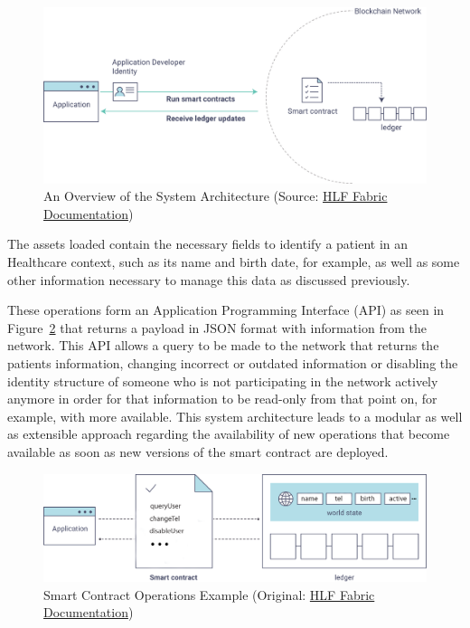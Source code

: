 \begin{figure}[ht] \centering
  \includegraphics[width=1\linewidth]{imgs/hyperledgerAppOverview.png}
  \caption{\label{fig:appOverview}An Overview of the System Architecture
  (Source:
  \href{http://hyperledger-fabric.readthedocs.io/en/latest/write_first_app.html}{HLF
  Fabric Documentation})} 
\end{figure}

The assets loaded contain the necessary fields to identify a patient in an
Healthcare context, such as its name and birth date, for example, as well as
some other information necessary to manage this data as discussed previously.

These operations form an Application Programming Interface (API) as seen in
Figure~\ref{fig:smartContractOverview} that returns a payload in JSON format
with information from the network. This API allows a query to be made to the
network that returns the patients information, changing incorrect or outdated
information or disabling the identity structure of someone who is not
participating in the network actively anymore in order for that information to
be read-only from that point on, for example, with more available. This system
architecture leads to a modular as well as extensible approach regarding the
availability of new operations that become available as soon as new versions of
the smart contract are deployed.  

\begin{figure}[ht] 
  \centering
  \includegraphics[width=1\linewidth]{imgs/smartContractOverview.png}
  \caption{\label{fig:smartContractOverview}Smart Contract Operations Example
  (Original:
  \href{http://hyperledger-fabric.readthedocs.io/en/latest/write_first_app.html}{HLF
  Fabric Documentation})} 
\end{figure}

